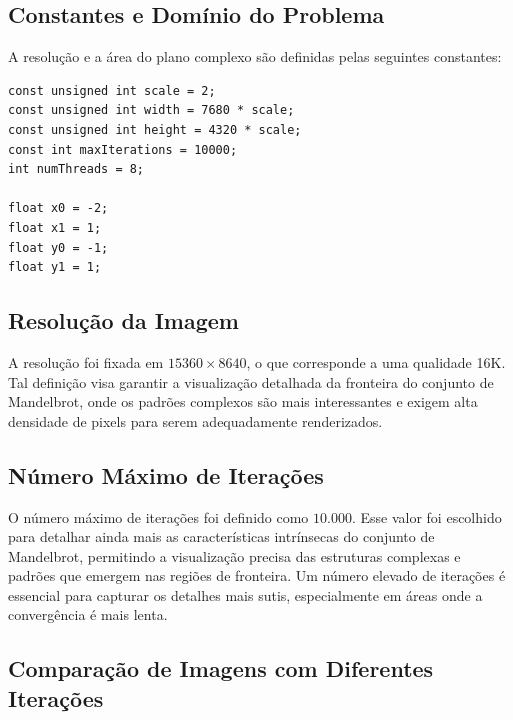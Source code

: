 \subsection{Constantes e Domínio do Problema}

A resolução e a área do plano complexo são definidas pelas seguintes constantes:

\begin{lstlisting}[caption=Constantes principais]
const unsigned int scale = 2;
const unsigned int width = 7680 * scale;
const unsigned int height = 4320 * scale;
const int maxIterations = 10000;
int numThreads = 8;

float x0 = -2;
float x1 = 1;
float y0 = -1;
float y1 = 1;
\end{lstlisting}

\subsection{Resolução da Imagem}

A resolução foi fixada em \( 15360 \times 8640 \), o que corresponde a uma qualidade 16K. Tal definição visa garantir a visualização detalhada da fronteira do conjunto de Mandelbrot, onde os padrões complexos são mais interessantes e exigem alta densidade de pixels para serem adequadamente renderizados.

\subsection{Número Máximo de Iterações}

O número máximo de iterações foi definido como \( 10.000 \). Esse valor foi escolhido para detalhar ainda mais as características intrínsecas do conjunto de Mandelbrot, permitindo a visualização precisa das estruturas complexas e padrões que emergem nas regiões de fronteira. Um número elevado de iterações é essencial para capturar os detalhes mais sutis, especialmente em áreas onde a convergência é mais lenta.

\subsection{Comparação de Imagens com Diferentes Iterações}


